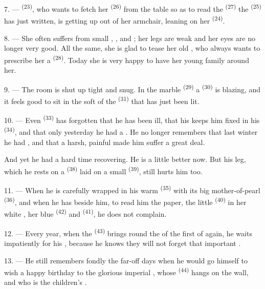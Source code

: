 7. ---  \textsuperscript{(23)}, who wants to fetch her
 \textsuperscript{(26)} from the table so as to read the
 \textsuperscript{(27)} the  \textsuperscript{(25)} has
just written, is getting up out of her armchair, leaning on her
 \textsuperscript{(24)}.

8. --- She often suffers from small , ,
 and ; her legs are weak and her eyes are no
longer very good. All the same, she is glad to tease her old
, who always wants to prescribe her a 
\textsuperscript{(28)}. Today she is very happy to have her young family around her.

9. --- The room is shut up tight and snug. In the marble 
\textsuperscript{(29)} a  \textsuperscript{(30)} is blazing, and it
feels good to sit in the soft  of the  \textsuperscript{(31)} that
has just been lit.

\VUsaut{4.2mm}
\VUsaut{3.0mm}

10. --- Even  \textsuperscript{(33)} has forgotten that he has been ill,
that his  keeps him fixed in his
 \textsuperscript{(34)}, and that only yesterday he had a
. He no longer remembers that last winter
he had , and that a harsh, painful  made him suffer a great
deal.

And yet he had a hard time recovering. He is a little better now. But his leg, which he rests
on a  \textsuperscript{(38)} laid on a small
 \textsuperscript{(39)}, still hurts him too.

11. --- When he is carefully wrapped in his warm  \textsuperscript{(35)}
with its big mother-of-pearl  \textsuperscript{(36)}, and when he has beside
him, to read him the paper, the little
 \textsuperscript{(40)} in her white , her blue
 \textsuperscript{(42)} and  \textsuperscript{(41)}, he does not
complain.

12. --- Every year, when the  \textsuperscript{(43)} brings round the
 of the first of  again, he waits impatiently for his
, because he knows they will not forget that important .

13. --- He still remembers fondly the far-off days when he would go himself to wish a happy
birthday to the glorious imperial
, whose  \textsuperscript{(44)} hangs on the wall, and
who is the children's .
\VUsaut{6.0mm}
\VUfilet{22mm}
